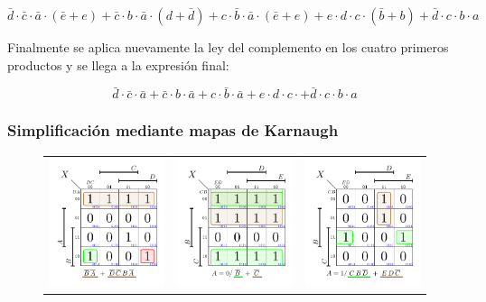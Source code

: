 \begin{equation}
\bar{d} \cdot \bar{c} \cdot \bar{a} \cdot (\bar{e} + e) + 
\bar{c} \cdot b \cdot \bar{a} \cdot (d + \bar{d}) + 
c \cdot \bar{b} \cdot \bar{a} \cdot (\bar{e} + e) + 
e \cdot d \cdot c \cdot (\bar{b} + b) +
\bar{d} \cdot c \cdot b \cdot a 
\end{equation}

Finalmente se aplica nuevamente la ley del complemento en los cuatro primeros productos y se llega a la expresión final:

\begin{equation}\label{canonica_minterm}
\boxed{\bar{d} \cdot \bar{c} \cdot \bar{a} + 
\bar{c} \cdot b \cdot \bar{a} + 
c \cdot \bar{b} \cdot \bar{a} + 
e \cdot d \cdot c \cdot + 
\bar{d} \cdot c \cdot b \cdot a}
\end{equation}


\subsubsection{Simplificación mediante mapas de Karnaugh}

\begin{figure}[H]
   \centering
\begin{tabular}{ccc}
	\includegraphics[width=4cm,trim={0.25cm 0.5cm  0.25cm 0.25cm},clip]{Ejercicio_2/Karnaugh/K1.pdf}& \hspace{3ex} 
	\includegraphics[width=4cm,trim={0.25cm 0.5cm  0.25cm 0.25cm},clip]{Ejercicio_2/Karnaugh/K2.pdf}&
	\includegraphics[width=4cm,trim={0.25cm 0.5cm  0.25cm 0.25cm},clip]{Ejercicio_2/Karnaugh/K3.pdf}\\
	\end{tabular}
    \label{fig:Karnaughs_encoder} %
\end{figure}

